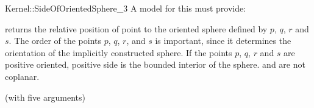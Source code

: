 \begin{ccRefFunctionObjectConcept}{Kernel::SideOfOrientedSphere_3}
A model for this must provide:


         {returns the relative position of point 
          to the oriented sphere defined by $p$, $q$, $r$ and $s$.
          The order of the points $p$, $q$, $r$, and $s$ is important,
          since it determines the orientation of the implicitly
          constructed sphere. If the points $p$, $q$, $r$ and $s$
          are positive oriented, positive side is the bounded interior
          of the sphere.
          \ccPrecond {} and  are not coplanar.}

\ccRefines
{} (with five arguments)

\ccSeeAlso
{} \\


\end{ccRefFunctionObjectConcept}
